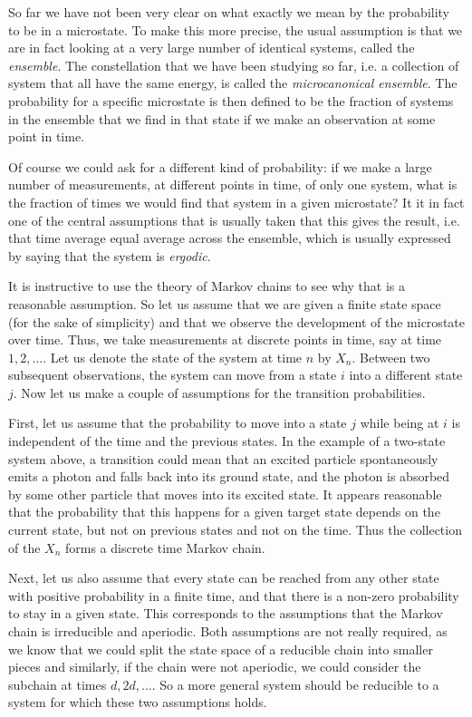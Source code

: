 \documentclass[a4paper, draft]{report}
\numberwithin{section}{chapter}
\numberwithin{equation}{chapter}
\theoremstyle{own}
\theoremstyle{remark}
\begin{document}
So far we have not been very clear on what exactly we mean by the probability to be in a microstate. To make this more precise, the usual assumption is that we are in fact looking at a very large number of identical systems, called the {\em ensemble}. The constellation that we have been studying so far, i.e. a collection of system that all have the same energy, is called the {\em microcanonical ensemble}. The probability for a specific microstate is then defined to be the fraction of systems in the ensemble that we find in that state if we make an observation at some point in time.

Of course we could ask for a different kind of probability: if we make a large number of measurements, at different points in time, of only one system, what is the fraction of times we would find that system in a given microstate? It it in fact one of the central assumptions that is usually taken that this gives the result, i.e. that time average equal average across the ensemble, which is usually expressed by saying that the system is {\em ergodic}. 

It is instructive to use the theory of Markov chains to see why that is a reasonable assumption. So let us assume that we are given a finite state space (for the sake of simplicity) and that we observe the development of the microstate over time. Thus, we take measurements at discrete points in time, say at time $1, 2, \dots$. Let us denote the state of the system at time $n$ by $X_n$. Between two subsequent observations, the system can move from a state $i$ into a different state $j$. Now let us make a couple of assumptions for the transition probabilities.

First, let us assume that the probability to move into a state $j$ while being at $i$ is independent of the time and the previous states. In the example of a two-state system above, a transition could mean that an excited particle spontaneously emits a photon and falls back into its ground state, and the photon is absorbed by some other particle that moves into its excited state. It appears reasonable that the probability that this happens for a given target state depends on the current state, but not on previous states and not on the time. Thus the collection of the $X_n$ forms a discrete time Markov chain. 

Next, let us also assume that every state can be reached from any other state with positive probability in a finite time, and that there is a non-zero probability to stay in a given state. This corresponds to the assumptions that the Markov chain is irreducible and aperiodic. Both assumptions are not really required, as we know that we could split the state space of a reducible chain into smaller pieces and similarly, if the chain were not aperiodic, we could consider the subchain at times $d, 2d, \dots$. So a more general system should be reducible to a system for which these two assumptions holds.
\end{document}
